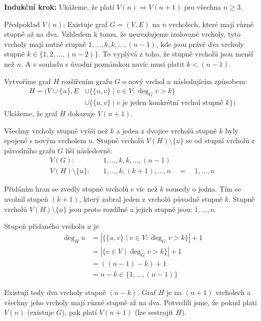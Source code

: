 \documentclass{article}
\begin{document}
\textbf{Indukční krok:} Ukážeme, že platí $V(n) \Rightarrow V(n+1)$ pro všechna $n \ge 3$.

Předpoklad $V(n)$: Existuje graf $G=(V, E)$ na $n$ vrcholech, které mají různé stupně až na dva. Vzhledem k tomu, že neuvažujeme izolované vrcholy, tyto vrcholy mají nutně stupně $1, \dots, k, k, \dots, (n-1)$, kde jsou právě dva vrcholy stupně $k \in \{ 1, 2, \dots, (n-2) \}$. To vyplývá z toho, že stupně vrcholů jsou menší než $n$. A v souladu s úvodní poznámkou navíc musí platit $k < (n-1)$.

Vytvoříme graf $H$ rozšířením grafu $G$ o nový vrchol $u$ následujícím způsobem:
\begin{align*}
    H = (
    V \cup \{ u \}, E
     & \cup\{ \{u, v\} \mid v \in V \colon \deg_G v > k \}                      \\
     & \cup \{ \{u, v\} \mid \text{$v$ je jeden konkrétní vrchol stupně $k$} \}
    )
\end{align*}
Ukážeme, že graf $H$ dokazuje $V(n+1)$.

Všechny vrcholy stupně vyšší než $k$ a jeden z dvojice vrcholů stupně $k$ byly spojené s novým vrcholem $u$. Stupně vrcholů $V(H) \setminus \{u\}$ se od stupní vrcholů z původního grafu $G$ liší následovně:
\begin{align*}
    V(G) \colon \quad
     & 1, \dots, k, k, \dots, (n-1)                           \\
    V(H) \setminus \{u\} \colon \quad
     & 1, \dots, k, (k+1), \dots, n \quad = \quad 1, \dots, n
\end{align*}

Přidáním hran se zvedly stupně vrcholů s víc než $k$ sousedy o jedna. Tím se uvolnil stupeň $(k+1)$, který zabral jeden z vrcholů původně stupně $k$. Stupně vrcholů $V(H) \setminus \{u\}$ jsou proto rozdílné a jejich stupně jsou: $1, \dots, n$.

Stupeň přidaného vrcholu $u$ je
\begin{align*}
    \deg_H u & = |\{ \{u, v\} \mid v \in V \colon \deg_G v > k \}| + 1 \\
             & = |\{ v \in V \mid \deg_G v > k \}| + 1                 \\
             & = ((n - 1) - k) + 1                                     \\
             & = n - k \in \{ 1, \dots, (n-1) \}
\end{align*}

Existují tedy dva vrcholy stupně $(n-k)$.
Graf $H$ je na $(n+1)$ vrcholech a všechny jeho vrcholy mají různé stupně až na dva. Potvrdili jsme, že pokud platí $V(n)$ (existuje $G$), pak platí $V(n+1)$ (lze sestrojit $H$).
\end{document}
